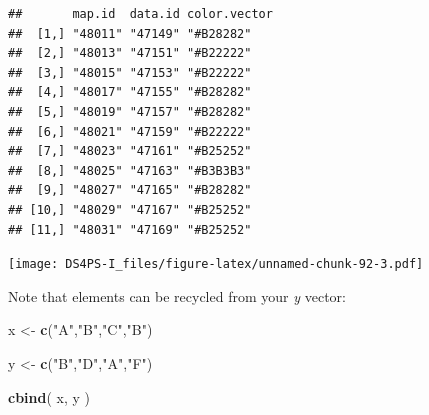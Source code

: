 \documentclass[]{book}
\newenvironment{Shaded}{\begin{snugshade}}{\end{snugshade}}
\newcommand{\CommentTok}[1]{\textcolor[rgb]{0.56,0.35,0.01}{\textit{#1}}}
\newcommand{\DataTypeTok}[1]{\textcolor[rgb]{0.13,0.29,0.53}{#1}}
\newcommand{\DecValTok}[1]{\textcolor[rgb]{0.00,0.00,0.81}{#1}}
\newcommand{\KeywordTok}[1]{\textcolor[rgb]{0.13,0.29,0.53}{\textbf{#1}}}
\newcommand{\NormalTok}[1]{#1}
\newcommand{\OperatorTok}[1]{\textcolor[rgb]{0.81,0.36,0.00}{\textbf{#1}}}
\newcommand{\StringTok}[1]{\textcolor[rgb]{0.31,0.60,0.02}{#1}}
\theoremstyle{definition}
\theoremstyle{definition}
\theoremstyle{definition}
\theoremstyle{remark}
\begin{document}
\begin{verbatim}
##       map.id  data.id color.vector
##  [1,] "48011" "47149" "#B28282"   
##  [2,] "48013" "47151" "#B22222"   
##  [3,] "48015" "47153" "#B22222"   
##  [4,] "48017" "47155" "#B28282"   
##  [5,] "48019" "47157" "#B28282"   
##  [6,] "48021" "47159" "#B22222"   
##  [7,] "48023" "47161" "#B25252"   
##  [8,] "48025" "47163" "#B3B3B3"   
##  [9,] "48027" "47165" "#B28282"   
## [10,] "48029" "47167" "#B25252"   
## [11,] "48031" "47169" "#B25252"
\end{verbatim}

\begin{Shaded}
\end{Shaded}

\texttt{[image: DS4PS-I\_files/figure-latex/unnamed-chunk-92-3.pdf]}

Note that elements can be recycled from your \emph{y} vector:

\begin{Shaded}
\begin{Highlighting}[]
\NormalTok{x <-}\StringTok{ }\KeywordTok{c}\NormalTok{(}\StringTok{"A"}\NormalTok{,}\StringTok{"B"}\NormalTok{,}\StringTok{"C"}\NormalTok{,}\StringTok{"B"}\NormalTok{)}

\NormalTok{y <-}\StringTok{ }\KeywordTok{c}\NormalTok{(}\StringTok{"B"}\NormalTok{,}\StringTok{"D"}\NormalTok{,}\StringTok{"A"}\NormalTok{,}\StringTok{"F"}\NormalTok{)}

\KeywordTok{cbind}\NormalTok{( x, y )}
\end{Highlighting}
\end{Shaded}
\end{document}
